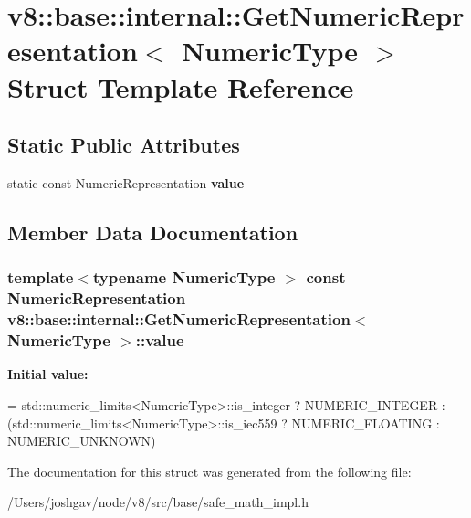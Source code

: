 \hypertarget{structv8_1_1base_1_1internal_1_1_get_numeric_representation}{}\section{v8\+:\+:base\+:\+:internal\+:\+:Get\+Numeric\+Representation$<$ Numeric\+Type $>$ Struct Template Reference}
\label{structv8_1_1base_1_1internal_1_1_get_numeric_representation}
\subsection*{Static Public Attributes}
\begin{DoxyCompactItemize}
\item 
static const Numeric\+Representation {\bfseries value}
\end{DoxyCompactItemize}


\subsection{Member Data Documentation}
\subsubsection[{\texorpdfstring{value}{value}}]{\setlength{\rightskip}{0pt plus 5cm}template$<$typename Numeric\+Type $>$ const Numeric\+Representation {\bf v8\+::base\+::internal\+::\+Get\+Numeric\+Representation}$<$ Numeric\+Type $>$\+::value\hspace{0.3cm}{\ttfamily [static]}}\hypertarget{structv8_1_1base_1_1internal_1_1_get_numeric_representation_a9c8a294e8231cc03cb6b3d7c6a93c9ba}{}\label{structv8_1_1base_1_1internal_1_1_get_numeric_representation_a9c8a294e8231cc03cb6b3d7c6a93c9ba}
{\bfseries Initial value\+:}
\begin{DoxyCode}
=
      std::numeric\_limits<NumericType>::is\_integer
          ? NUMERIC\_INTEGER
          : (std::numeric\_limits<NumericType>::is\_iec559 ? NUMERIC\_FLOATING
                                                         : NUMERIC\_UNKNOWN)
\end{DoxyCode}


The documentation for this struct was generated from the following file\+:\begin{DoxyCompactItemize}
\item 
/\+Users/joshgav/node/v8/src/base/safe\+\_\+math\+\_\+impl.\+h\end{DoxyCompactItemize}
